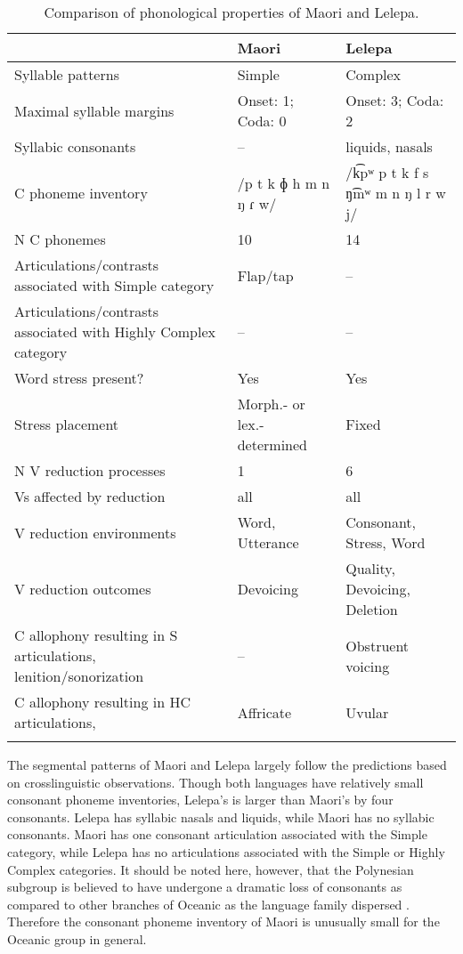 \begin{table}
\small
\begin{tabularx}{\textwidth}{III}
\lsptoprule
 & {Maori} & {Lelepa}\\
 \midrule 
 {Syllable patterns} & Simple & Complex\\
\tablevspace
 {Maximal syllable margins} & Onset: 1; Coda: 0 & Onset: 3; Coda: 2\\
\tablevspace
 {Syllabic consonants} & -- & liquids, nasals\\
\tablevspace
 {C phoneme inventory} & /p t k ɸ h m n ŋ ɾ w/ & /k͡pʷ p t k f s ŋ͡mʷ m n ŋ l r w j/\\
\tablevspace
 {N C phonemes} & 10 & 14\\
\tablevspace
 {Articulations/contrasts associated with {Simple}} {category} & {Flap/tap} & {--}\\
\tablevspace
 {Articulations/contrasts associated with {Highly Complex}} {category} & {--} & {--}\\
\tablevspace
 {Word stress present?} & {Yes} & {Yes}\\
\tablevspace
 {Stress placement} & {Morph.- or lex.-determined} & {Fixed}\\
\tablevspace
 {N V reduction processes} & {1} & {6}\\
\tablevspace
 {Vs affected by reduction}  & {all} & {all}\\
\tablevspace
 {V reduction environments} & {Word, Utterance} & {Consonant, Stress, Word}\\
\tablevspace
 {V reduction outcomes} & {Devoicing} & {Quality, Devoicing, Deletion}\\
\tablevspace
 {C allophony resulting in S articulations, lenition/sonorization} & {--} & { {Obstruent voicing}}\\
\tablevspace
{ {C allophony resulting in HC articulations,} } & { {Affricate}} & {Uvular}\\
\lspbottomrule
\end{tabularx}
\caption{\label{tab:8.7}Comparison of phonological properties of Maori and Lelepa.}
\end{table}

  The segmental patterns of Maori and Lelepa largely follow the predictions based on crosslinguistic observations. Though both languages have relatively small consonant phoneme inventories, Lelepa’s is larger than Maori’s by four consonants. Lelepa has syllabic nasals and liquids, while Maori has no syllabic consonants. Maori has one consonant articulation associated with the Simple category, while Lelepa has no articulations associated with the Simple or Highly Complex categories. It should be noted here, however, that the Polynesian subgroup is believed to have undergone a dramatic loss of consonants as compared to other branches of Oceanic as the language family dispersed \citep{Trudgill2004}. Therefore the consonant phoneme inventory of Maori is unusually small for the Oceanic group in general.

